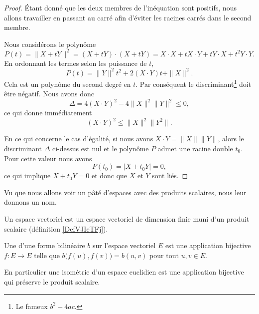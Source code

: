 \begin{proof}
	Étant donné que les deux membres de l'inéquation sont positifs, nous allons travailler en passant au carré afin d'éviter les racines carrés dans le second membre.

	Nous considérons le polynôme
	\begin{equation}
		P(t)=\| X+tY \|^2=(X+tY)\cdot(X+tY)=X\cdot X+tX\cdot Y+tY\cdot X+t^2Y\cdot Y.
	\end{equation}
	En ordonnant les termes selon les puissance de $t$,
	\begin{equation}
		P(t)=\| Y \|^2t^2+2(X\cdot Y)t+\| X \|^2.
	\end{equation}
	Cela est un polynôme du second degré en $t$. Par conséquent le discriminant\footnote{Le fameux $b^2-4ac$.} doit être négatif. Nous avons donc
	\begin{equation}
		\Delta=4(X\cdot Y)^2-4\| X \|^2\| Y \|^2\leq 0,
	\end{equation}
	ce qui donne immédiatement
	\begin{equation}
		(X\cdot Y)^2\leq\| X \|^2\| Y^2 \|.
	\end{equation}

    En ce qui concerne le cas d'égalité, si nous avons \( X\cdot Y=\| X \|\| Y \|\), alors le discriminant \( \Delta\) ci-dessus est nul et le polynôme \( P\) admet une racine double \( t_0\). Pour cette valeur nous avons
    \begin{equation}
        P(t_0)=| X+t_0Y |=0,
    \end{equation}
    ce qui implique \( X+t_0Y=0\) et donc que \( X\) et \( Y\) sont liés.
\end{proof}

Vu que nous allons voir un pâté d'espaces avec des produits scalaires, nous leur donnons un nom.
\begin{definition}\label{DefLZMcvfj}
    Un espace vectoriel  est un espace vectoriel de dimension finie muni d'un produit scalaire (définition \ref{DefVJIeTFj}).
\end{definition}

\begin{definition}      \label{DEFooGGTYooXsHIZj}
    Une  d'une forme bilinéaire \( b\) sur l'espace vectoriel \( E\) est une application bijective \( f\colon E\to E\) telle que \( b\big( f(u),f(v) \big)=b(u,v)\) pour tout \( u,v\in E\).
\end{definition}
En particulier une isométrie d'un espace euclidien est une application bijective qui préserve le produit scalaire.

